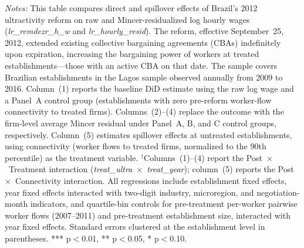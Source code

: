 \documentclass[12pt,letterpaper]{article}
\begin{document}
\begin{table}[]
\begin{threeparttable}
\begin{tablenotes}
\item \textit{Notes:} This table compares direct and spillover effects of Brazil's 2012 ultractivity reform on raw and Mincer-residualized log hourly wages (\textit{lr\_remdezr\_h\_w} and \textit{lr\_hourly\_resid}). The reform, effective September~25, 2012, extended existing collective bargaining agreements (CBAs) indefinitely upon expiration, increasing the bargaining power of workers at treated establishments---those with an active CBA on that date. The sample covers Brazilian establishments in the Lagos sample observed annually from 2009 to 2016. Column~(1) reports the baseline DiD estimate using the raw log wage and a Panel~A control group (establishments with zero pre-reform worker-flow connectivity to treated firms). Columns~(2)--(4) replace the outcome with the firm-level average Mincer residual under Panel~A, B, and C control groups, respectively. Column~(5) estimates spillover effects at untreated establishments, using connectivity (worker flows to treated firms, normalized to the 90th percentile) as the treatment variable. $^\dagger$Columns~(1)--(4) report the Post~$\times$~Treatment interaction (\textit{treat\_ultra}~$\times$~\textit{treat\_year}); column~(5) reports the Post~$\times$~Connectivity interaction. All regressions include establishment fixed effects, year fixed effects interacted with two-digit industry, microregion, and negotiation-month indicators, and quartile-bin controls for pre-treatment per-worker pairwise worker flows (2007--2011) and pre-treatment establishment size, interacted with year fixed effects. Standard errors clustered at the establishment level in parentheses. *** p$<$0.01, ** p$<$0.05, * p$<$0.10.
\end{tablenotes}
\end{threeparttable}
\end{table}
\end{document}
